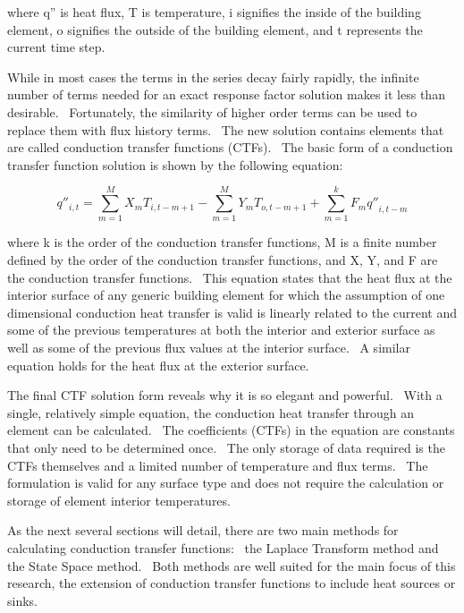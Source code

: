 where q'' is heat flux, T is temperature, i signifies the inside of the building element, o signifies the outside of the building element, and t represents the current time step.

While in most cases the terms in the series decay fairly rapidly, the infinite number of terms needed for an exact response factor solution makes it less than desirable.~ Fortunately, the similarity of higher order terms can be used to replace them with flux history terms.~ The new solution contains elements that are called conduction transfer functions (CTFs).~ The basic form of a conduction transfer function solution is shown by the following equation:

\begin{equation}
{q''_{i,t}} = \sum\limits_{m = 1}^M {{X_m}{T_{i,t - m + 1}}}  - \sum\limits_{m = 1}^M {{Y_m}{T_{o,t - m + 1}}}  + \sum\limits_{m = 1}^k {{F_m}{{q''}_{i,t - m}}}
\end{equation}

where k is the order of the conduction transfer functions, M is a finite number defined by the order of the conduction transfer functions, and X, Y, and F are the conduction transfer functions.~ This equation states that the heat flux at the interior surface of any generic building element for which the assumption of one dimensional conduction heat transfer is valid is linearly related to the current and some of the previous temperatures at both the interior and exterior surface as well as some of the previous flux values at the interior surface.~ A similar equation holds for the heat flux at the exterior surface.

The final CTF solution form reveals why it is so elegant and powerful.~ With a single, relatively simple equation, the conduction heat transfer through an element can be calculated.~ The coefficients (CTFs) in the equation are constants that only need to be determined once.~ The only storage of data required is the CTFs themselves and a limited number of temperature and flux terms.~ The formulation is valid for any surface type and does not require the calculation or storage of element interior temperatures.

As the next several sections will detail, there are two main methods for calculating conduction transfer functions:~ the Laplace Transform method and the State Space method.~ Both methods are well suited for the main focus of this research, the extension of conduction transfer functions to include heat sources or sinks.

